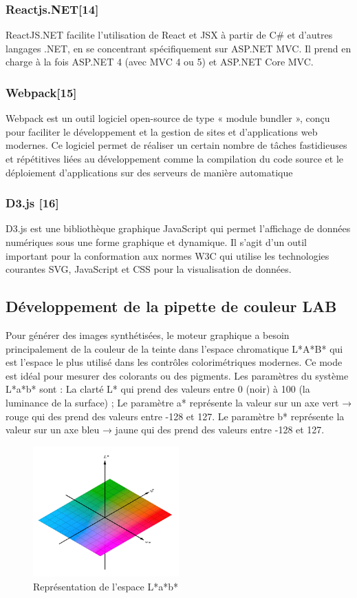 \subsubsection*{Reactjs.NET[14]}
ReactJS.NET facilite l'utilisation de React et JSX à partir de C# et d'autres langages .NET, en se concentrant spécifiquement sur ASP.NET MVC. Il prend en charge à la fois ASP.NET 4 (avec MVC 4 ou 5) et ASP.NET Core MVC.


\subsubsection*{Webpack[15]}
Webpack est un outil logiciel open-source de type « module bundler », conçu pour faciliter le développement et la gestion de sites et d'applications web modernes.
Ce logiciel permet de réaliser un certain nombre de tâches fastidieuses et répétitives liées au développement comme la compilation du code source et le déploiement d'applications sur des serveurs de manière automatique


\subsubsection*{D3.js [16]}
D3.js est une bibliothèque graphique JavaScript qui permet l'affichage de données numériques sous une forme graphique et dynamique. Il s'agit d'un outil important pour la conformation aux normes W3C qui utilise les technologies courantes SVG, JavaScript et CSS pour la visualisation de données.


\newpage
\subsection{Développement de la pipette de couleur LAB}
Pour générer des images synthétisées, le moteur graphique a besoin principalement de la couleur de la teinte dans l’espace chromatique L*A*B* qui est l'espace le plus utilisé dans les contrôles colorimétriques modernes. Ce mode est idéal pour mesurer des colorants ou des pigments. 
Les paramètres du système L*a*b* sont :
La clarté L* qui prend des valeurs entre 0 (noir) à 100 (la luminance de la surface) ;
Le paramètre a* représente la valeur sur un axe vert → rouge qui des prend des valeurs entre -128 et 127.
Le paramètre b* représente la valeur sur un axe bleu → jaune qui des prend des valeurs entre -128 et 127.

\begin{figure}[!ht]\centering
\includegraphics[width=0.5\textwidth]{chapitres/chapitre5/figures/RGB.png}
\caption{Représentation de l'espace L*a*b*}
\label{fig:git}
\end{figure}

